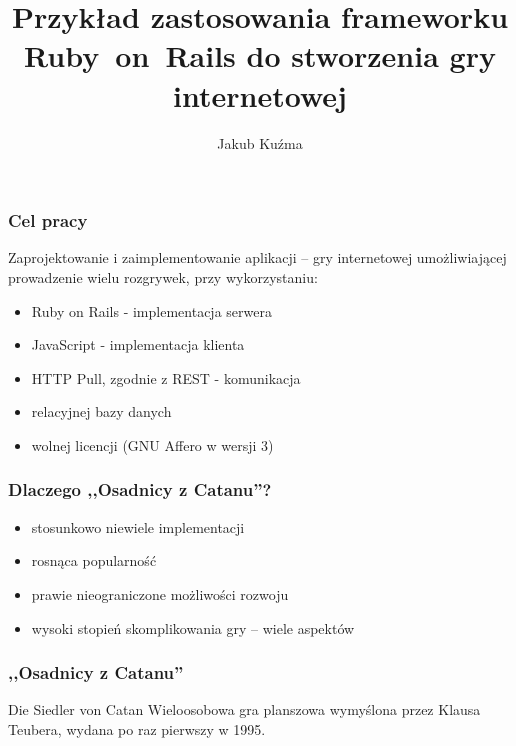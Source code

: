 \documentclass[12pt]{beamer}
\author{Jakub Kuźma}
\title{Przykład zastosowania frameworku Ruby~on~Rails do stworzenia
  gry internetowej}
\begin{document}
\frame{\titlepage}

\begin{frame}
  \frametitle{Cel pracy} Zaprojektowanie i zaimplementowanie aplikacji
  -- gry internetowej umożliwiającej prowadzenie wielu rozgrywek,
  przy wykorzystaniu:
  \begin{itemize}
  \item Ruby on Rails - implementacja serwera
  \item JavaScript - implementacja klienta
  \item HTTP Pull, zgodnie z REST - komunikacja
  \item relacyjnej bazy danych
  \item wolnej licencji (GNU Affero w wersji 3)
  \end{itemize}
\end{frame}

\begin{frame}
  \frametitle{Dlaczego ,,Osadnicy z Catanu''?}
  \begin{itemize}
  \item stosunkowo niewiele implementacji
  \item rosnąca popularność
  \item prawie nieograniczone możliwości rozwoju
  \item wysoki stopień skomplikowania gry -- wiele aspektów
  \end{itemize}
\end{frame}

\begin{frame}
  \frametitle{,,Osadnicy z Catanu''}
  \begin{block}{Die Siedler von Catan}
    Wieloosobowa gra planszowa wymyślona przez Klausa Teubera, wydana
    po raz pierwszy w 1995.
  \end{block}
\end{frame}
\end{document}
